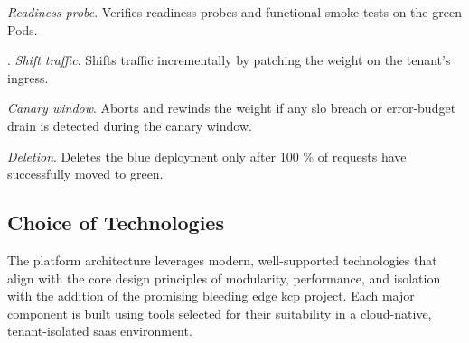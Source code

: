 \documentclass[11pt, a4paper, oneside, listof=totoc]{scrartcl}
\begin{document}
                    \begin{enumerate}[label={[\arabic*]:},
                        ref=Challenge~\arabic*,
                        leftmargin=*,
                        itemsep=0.6\baselineskip]

                        \item\label{chal:readinessProbe}
                            \textit{Readiness probe}.
                            Verifies readiness probes and functional smoke-tests on the green Pods.

                        \item\label{chal:shiftTraffic}.
                            \textit{Shift traffic}.
                            Shifts traffic incrementally by patching the weight on the tenant's
                            ingress.

                        \item\label{chal:canaryWindow}
                            \textit{Canary window}.
                            Aborts and rewinds the weight if any \gls{slo} breach or error-budget
                            drain is detected during the canary window.
                        
                        \item\label{chal:deletion}
                            \textit{Deletion}.
                            Deletes the blue deployment only after 100 \% of requests have
                            successfully moved to green.

                    \end{enumerate}

            \clearpage

        \subsection{Choice of Technologies}\label{subsec:technologies}
            The platform architecture leverages modern, well-supported technologies that align with
            the core design principles of modularity, performance, and isolation with the addition
            of the promising bleeding edge \gls{kcp} project.
            Each major component is built using tools selected for their suitability in a
            cloud-native, tenant-isolated \gls{saas} environment.
\end{document}
